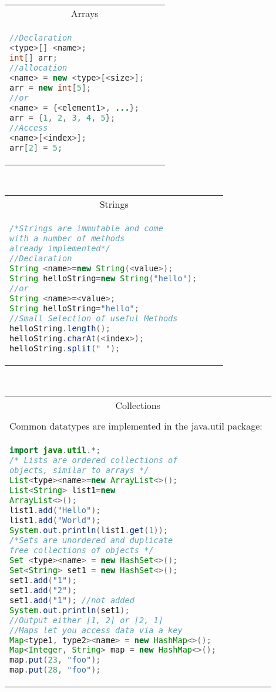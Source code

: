 \documentclass[a4paper, 8pt]{extarticle}
\begin{document}
\begin{minipage}[t]{0.25\linewidth}
\begin{tabular}{|p{0.9\linewidth}|}
\multicolumn{1}{|c|}{\cellcolor{headcol}\color{white}Arrays}\\
\begin{lstlisting}[language=Java, aboveskip=-2pt,belowskip=-6pt]
//Declaration
<type>[] <name>;
int[] arr;
//allocation
<name> = new <type>[<size>];
arr = new int[5];
//or
<name> = {<element1>, ...};
arr = {1, 2, 3, 4, 5};
//Access
<name>[<index>];
arr[2] = 5;
\end{lstlisting}
\\\hline
\end{tabular}
\\[3pt]
\begin{tabular}{|p{0.9\linewidth}|}
\multicolumn{1}{|c|}{\cellcolor{headcol}\color{white}Strings}\\
\begin{lstlisting}[language=Java, aboveskip=-2pt,belowskip=-6pt]
/*Strings are immutable and come 
with a number of methods 
already implemented*/
//Declaration
String <name>=new String(<value>);
String helloString=new String("hello");
//or
String <name>=<value>;
String helloString="hello";
//Small Selection of useful Methods
helloString.length();
helloString.charAt(<index>);
helloString.split(" ");
\end{lstlisting}
\\\hline
\end{tabular}
\\[3pt]
\begin{tabular}{|p{0.9\linewidth}|}
\multicolumn{1}{|c|}{\cellcolor{headcol}\color{white}Collections}\\
\\[-7pt]
Common  datatypes are implemented in the 
java.util package:\\
\begin{lstlisting}[language=Java, aboveskip=-2pt,belowskip=-6pt]
import java.util.*;
/* Lists are ordered collections of 
objects, similar to arrays */
List<type><name>=new ArrayList<>();
List<String> list1=new 
ArrayList<>();
list1.add("Hello");
list1.add("World");
System.out.println(list1.get(1));
/*Sets are unordered and duplicate 
free collections of objects */
Set <type><name> = new HashSet<>();
Set<String> set1 = new HashSet<>();
set1.add("1");
set1.add("2");
set1.add("1"); //not added
System.out.println(set1);
//Output either [1, 2] or [2, 1]
//Maps let you access data via a key
Map<type1, type2><name> = new HashMap<>();
Map<Integer, String> map = new HashMap<>();
map.put(23, "foo");
map.put(28, "foo");

\end{lstlisting}
\end{tabular}
\end{minipage}
\end{document}
